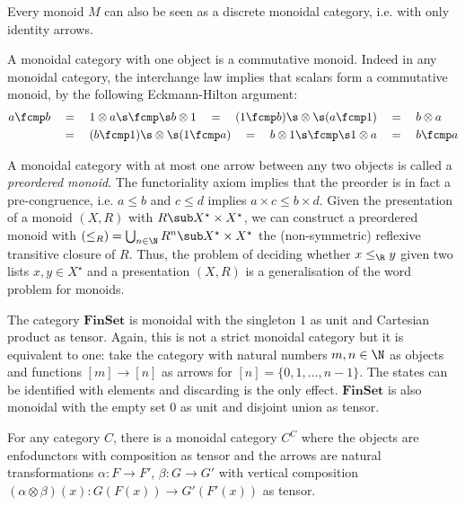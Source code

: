\begin{example}
Every monoid $M$ can also be seen as a discrete monoidal category, i.e. with only identity arrows.
\end{example}

\begin{example}
A monoidal category with one object is a commutative monoid.
Indeed in any monoidal category, the interchange law implies that scalars form a commutative monoid, by the following Eckmann-Hilton argument:
\begin{align*}
a \fcmp b
&\quad = \quad 1 \otimes a \s \fcmp \s b \otimes 1
\quad = \quad (1 \fcmp b) \s \otimes \s (a \fcmp 1)
\quad = \quad b \otimes a
\\
&\quad = \quad (b \fcmp 1) \s \otimes \s (1 \fcmp a)
\quad = \quad b \otimes 1 \s \fcmp \s 1 \otimes a
\quad = \quad b \fcmp a
\end{align*}
\end{example}

\begin{example}
A monoidal category with at most one arrow between any two objects is called a \emph{preordered monoid}.
The functoriality axiom implies that the preorder is in fact a pre-congruence, i.e. $a \leq b$ and $c \leq d$ implies $a \times c \leq b \times d$.
Given the presentation of a monoid $(X, R)$ with $R \sub X^\star \times X^\star$, we can construct a preordered monoid with $(\leq_R) = \bigcup_{n \in \N} R^n \sub X^\star \times X^\star$ the (non-symmetric) reflexive transitive closure of $R$.
Thus, the problem of deciding whether $x \leq_\R y$ given two lists $x, y \in X^\star$ and a presentation $(X, R)$ is a generalisation of the word problem for monoids.
\end{example}

\begin{example}
The category $\mathbf{FinSet}$ is monoidal with the singleton $1$ as unit and Cartesian product as tensor.
Again, this is not a strict monoidal category but it is equivalent to one: take the category with natural numbers $m, n \in \N$ as objects and functions $[m] \to [n]$ as arrows for $[n] = \{ 0, 1, \dots, n - 1 \}$.
The states can be identified with elements and discarding is the only effect.
$\mathbf{FinSet}$ is also monoidal with the empty set $0$ as unit and disjoint union as tensor.
\end{example}

\begin{example}\label{example:endofunctors are monoidal}
For any category $C$, there is a monoidal category $C^C$ where the objects are enfodunctors with composition as tensor and the arrows are natural transformations $\alpha : F \to F'$, $\beta : G \to G'$ with vertical composition $(\alpha \otimes \beta)(x) : G(F(x)) \to G'(F'(x))$ as tensor.
\end{example}

